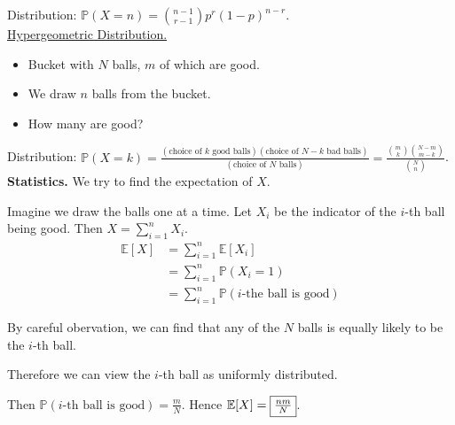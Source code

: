 \documentclass[a4paper,11pt]{amsbook}
\theoremstyle{definition}
\theoremstyle{remark}
\newcommand{\E}{\mathbb{E}}
\renewcommand{\P}{\mathbb{P}}
\newcommand\0{\varnothing}
\begin{document}
    Distribution: $\P(X=n)=\binom{n-1}{r-1}p^r(1-p)^{n-r}$.\\

    \noindent \underline{Hypergeometric Distribution.} \begin{itemize}
        \item Bucket with $N$ balls, $m$ of which are good.
        \item We draw $n$ balls from the bucket.
        \item How many are good?
    \end{itemize}
    Distribution: $\P(X=k)=\frac{(\text{choice of $k$ good balls})(\text{choice of $N-k$ bad balls})}{(\text{choice of $N$ balls})}=\frac{\binom mk\binom{N-m}{m-k}}{\binom Nn}$.\\
    \textbf{Statistics.} We try to find the expectation of $X$.

    Imagine we draw the balls one at a time. Let $X_i$ be the indicator of the $i$-th ball being good.
    Then $X=\sum_{i=1}^nX_i$. \begin{align*}
        \E[X]&=\sum_{i=1}^n\E[X_i] \tag{LoE} \\
        &=\sum_{i=1}^n\P(X_i=1) \\
        &=\sum_{i=1}^n\P(i\text{-the ball is good})
    \end{align*}

    By careful obervation, we can find that any of the $N$ balls is equally likely to be the $i$-th ball.
    
    Therefore we can view the $i$-th ball as uniformly distributed.

    Then $\P(i\text{-th ball is good})=\frac mN$.
    Hence $\E[X]=\fbox{$\frac{nm}{N}$}$.\\
\end{document}
